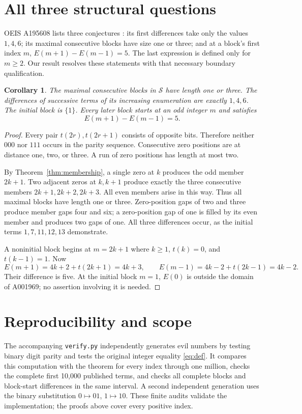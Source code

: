 \documentclass[10pt]{article}
\newtheorem{corollary}{Corollary}
\newcommand{\tm}{t}
\begin{document}
\section{All three structural questions}
OEIS A195608 lists three conjectures \cite{target}: its first
differences take only the values $1,4,6$; its maximal consecutive
blocks have size one or three; and at a block's first index $m$,
$E(m+1)-E(m-1)=5$. The last expression is defined only for $m\ge2$.
Our result resolves these statements with that necessary boundary
qualification.

\begin{corollary}\label{cor:blocks}
The maximal consecutive blocks in $\mathcal S$ have length one or
three. The differences of successive terms of its increasing
enumeration are exactly $1,4,6$. The initial block is $\{1\}$.
Every later block starts at an odd integer $m$ and satisfies
\[
 E(m+1)-E(m-1)=5.
\]
\end{corollary}
\begin{proof}
Every pair $\tm(2r),\tm(2r+1)$ consists of opposite bits. Therefore
neither $000$ nor $111$ occurs in the parity sequence. Consecutive
zero positions are at distance one, two, or three. A run of zero
positions has length at most two.

By Theorem~\ref{thm:membership}, a single zero at $k$ produces the
odd member $2k+1$. Two adjacent zeros at $k,k+1$ produce exactly
the three consecutive members $2k+1,2k+2,2k+3$. All even members
arise in this way. Thus all maximal blocks have length one or three.
Zero-position gaps of two and three produce member gaps four and
six; a zero-position gap of one is filled by its even member and
produces two gaps of one. All three differences occur, as the
initial terms $1,7,11,12,13$ demonstrate.

A noninitial block begins at $m=2k+1$ where $k\ge1$,
$\tm(k)=0$, and $\tm(k-1)=1$. Now
\[
 E(m+1)=4k+2+\tm(2k+1)=4k+3,
 \qquad
 E(m-1)=4k-2+\tm(2k-1)=4k-2.
\]
Their difference is five. At the initial block $m=1$, $E(0)$ is
outside the domain of A001969; no assertion involving it is needed.
\end{proof}

\section{Reproducibility and scope}
The accompanying \texttt{verify.py} independently generates evil
numbers by testing binary digit parity and tests the original
integer equality \eqref{eq:def}. It compares this computation with
the theorem for every index through one million, checks the complete
first 10,000 published terms, and checks all complete blocks and
block-start differences in the same interval. A second independent
generation uses the binary substitution $0\mapsto01$, $1\mapsto10$.
These finite audits validate the implementation; the proofs above
cover every positive index.
\end{document}
